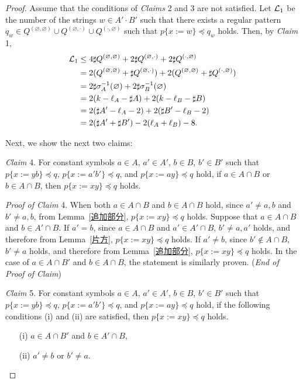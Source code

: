 \begin{proof}
\smallskip

\noindent
Assume that the conditions of \textit{Claims} 2 and 3 are not satisfied.
Let ${\cal L}_{1}$ be the number of the strings $w \in A'\cdot B'$ such that there exists a regular pattern $q_{w} \in Q^{(\varnothing,\varnothing)} \cup Q^{(\varnothing,\cdot)} \cup Q^{(\cdot,\varnothing)}$ such that $p \{ x:=w \} \preceq q_{w}$ holds.
Then, by \textit{Claim} 1,
\begin{align*}
  {\cal L}_{1} &\leq 4\sharp Q^{(\varnothing,\varnothing)} + 2\sharp Q^{(\varnothing,\cdot)} + 2\sharp Q^{(\cdot,\varnothing)}\\
  & = 2(Q^{(\varnothing,\varnothing)} + \sharp Q^{(\varnothing,\cdot)}) + 2(Q^{(\varnothing,\varnothing)} + \sharp Q^{(\cdot,\varnothing)})\\
  & = 2\sharp \sigma_{A}^{-1}(\varnothing) + 2\sharp \sigma_{B}^{-1}(\varnothing)\\
  & = 2(k - \ell_{A} - \sharp A) + 2(k - \ell_{B} - \sharp B)\\
  & = 2(\sharp A' - \ell_{A} - 2) + 2(\sharp B' - \ell_{B} - 2)\\
  & = 2(\sharp A' + \sharp B') - 2(\ell_{A} + \ell_{B}) - 8.
\end{align*}
  
Next, we show the next two claims:

\smallskip

\noindent
\textit{Claim} 4. 
For constant symbols $a \in A$, $a' \in A'$, $b \in B$, $b' \in B'$ such that $p\{x:=yb\} \preceq q$, $p\{x:=a'b'\} \preceq q$, and $p\{x:=ay\} \preceq q$ hold,
if $a \in A\cap B$ or $b \in A\cap B$, then $p\{x:=xy\} \preceq q$ holds.

\smallskip

\noindent
\textit{Proof of Claim} 4. 
When both $a\in A\cap B$ and $b \in A\cap B$ hold, since $a' \not= a, b$ and $b' \not= a, b$, from Lemma~\ref{追加部分}, $p\{x:=xy\} \preceq q$ holds.
Suppose that $a\in A\cap B$ and $b\in A'\cap B$.
If $a' = b$, since $a\in A\cap B$ and $a' \in A'\cap B$, $b' \not= a, a'$ holds, and therefore from Lemma~\ref{片方}, $p\{x:=xy\} \preceq q$ holds. If $a' \not= b$, since $b' \not\in A\cap B$, $b' \not= a$ holds, and therefore from Lemma~\ref{追加部分}, $p\{x:=xy\} \preceq q$ holds.
In the case of $a\in A\cap B'$ and $b\in A\cap B$, the statement is similarly proven. (\textit{End of Proof of Claim})

\smallskip

\noindent
\textit{Claim} 5. 
For constant symbols $a \in A$, $a' \in A'$, $b \in B$, $b' \in B'$ such that $p\{x:=yb\} \preceq q$, $p\{x:=a'b'\} \preceq q$, and $p\{x:=ay\} \preceq q$ hold, if the following conditions (i) and (ii) are satisfied, then $p\{x:=xy\} \preceq q$ holds.
\begin{enumerate}
  \item[(i)] $a \in A\cap B'$ and $b \in A'\cap B$,
  \item[(ii)] $a' \not= b$ or $b' \not= a$.
  \end{enumerate}
  

\end{proof}
